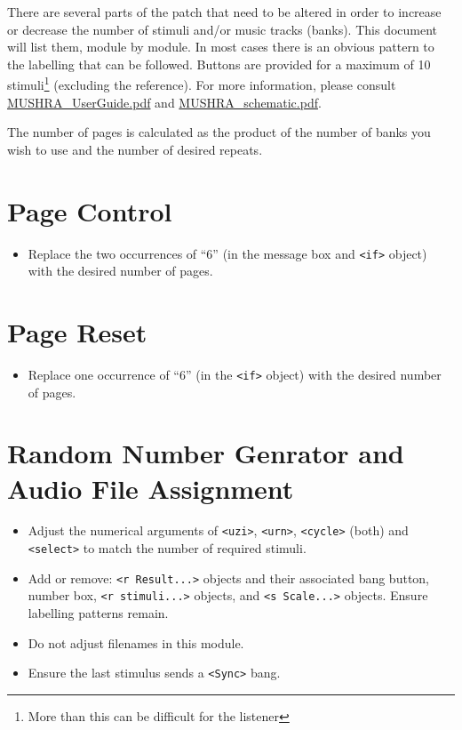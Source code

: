 \documentclass[10pt]{article}
\begin{document}
{\sf\maketitle}

There are several parts of the patch that need to be altered in order to increase or decrease the number of stimuli and/or music tracks (banks). This document will list them, module by module. In most cases there is an obvious pattern to the labelling that can be followed.  Buttons are provided for a maximum of 10 stimuli\footnote{More than this can be difficult for the listener} (excluding the reference).  For more information, please consult \href{MUSHRA_UserGuide.pdf}{MUSHRA\_UserGuide.pdf} and \href{MUSHRA_schematic.pdf}{MUSHRA\_schematic.pdf}.

The number of pages is calculated as the product of the number of banks you wish to use and the number of desired repeats.

\section{Page Control}
\begin{itemize}
\item Replace the two occurrences of ``6'' (in the message box and \verb|<if>| object) with the desired number of pages.
\end{itemize}

\section{Page Reset}
\begin{itemize}
\item Replace one occurrence of ``6'' (in the \verb|<if>| object) with the desired number of pages.
\end{itemize}

\section{Random Number Genrator and Audio File Assignment}
\begin{itemize}
\item  Adjust the numerical arguments of \verb|<uzi>|, \verb|<urn>|, \verb|<cycle>| (both) and \verb|<select>| to match the number of required stimuli.
\item  Add or remove: \verb|<r Result...>| objects and their associated bang button, number box, \verb|<r stimuli...>| objects, and \verb|<s Scale...>| objects. Ensure labelling patterns remain.
\item  Do not adjust filenames in this module.
\item  Ensure the last stimulus sends a \verb|<Sync>| bang.
\end{itemize}
\end{document}
